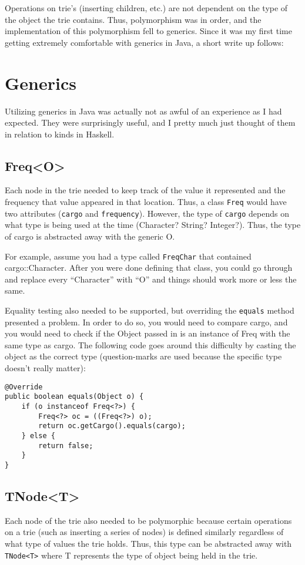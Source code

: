 \documentclass[12pt]{article}
\begin{document}
      Operations on trie's (inserting children, etc.) are not dependent on the type of the object the trie contains. Thus, polymorphism was in order, and the implementation of this polymorphism fell to generics. Since it was my first time getting extremely comfortable with generics in Java, a short write up follows:

  \section{Generics}
    Utilizing generics in Java was actually not as awful of an experience as I had expected. They were surprisingly useful, and I pretty much just thought of them in relation to kinds in Haskell.

    \subsection{Freq<O>}
      Each node in the trie needed to keep track of the value it represented and the frequency that value appeared in that location. Thus, a class \texttt{Freq} would have two attributes (\texttt{cargo} and \texttt{frequency}). However, the type of \texttt{cargo} depends on what type is being used at the time (Character? String? Integer?). Thus, the type of cargo is abstracted away with the generic O. 

      For example, assume you had a type called \texttt{FreqChar} that contained cargo::Character. After you were done defining that class, you could go through and replace every ``Character'' with ``O'' and things should work more or less the same.

      Equality testing also needed to be supported, but overriding the \texttt{equals} method presented a problem. In order to do so, you would need to compare cargo, and you would need to check if the Object passed in is an instance of Freq with the same type as cargo. The following code goes around this difficulty by casting the object as the correct type (question-marks are used because the specific type doesn't really matter):

      \begin{verbatim}
@Override
public boolean equals(Object o) {
    if (o instanceof Freq<?>) {
        Freq<?> oc = ((Freq<?>) o);
        return oc.getCargo().equals(cargo);
    } else {
        return false;
    }
}
      \end{verbatim}

    \subsection{TNode<T>}
      Each node of the trie also needed to be polymorphic because certain operations on a trie (such as inserting a series of nodes) is defined similarly regardless of what type of values the trie holds. Thus, this type can be abstracted away with \texttt{TNode<T>} where T represents the type of object being held in the trie. 
\end{document}
